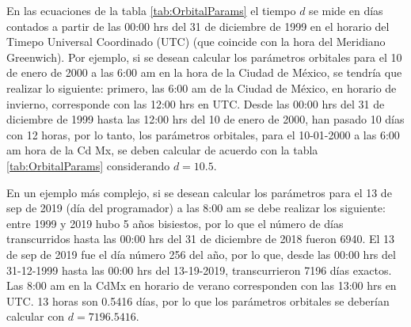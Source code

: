 \documentclass[a4paper,10pt]{article}
\begin{document}
En las ecuaciones de la tabla \ref{tab:OrbitalParams} el tiempo $d$ se mide en días contados a partir de las 00:00 hrs del 31 de diciembre de 1999 en el horario del Timepo Universal Coordinado (UTC) (que coincide con la hora del Meridiano Greenwich). Por ejemplo, si se desean calcular los parámetros orbitales para el 10 de enero de 2000 a las 6:00 am en la hora de la Ciudad de México, se tendría que realizar lo siguiente: primero, las 6:00 am de la Ciudad de México, en horario de invierno, corresponde con las 12:00 hrs en UTC. Desde las 00:00 hrs del 31 de diciembre de 1999 hasta las 12:00 hrs del 10 de enero de 2000, han pasado 10 días con 12 horas, por lo tanto, los parámetros orbitales, para el 10-01-2000 a las 6:00 am hora de la Cd Mx, se deben calcular de acuerdo con la tabla \ref{tab:OrbitalParams} considerando $d=10.5$.

En un ejemplo más complejo, si se desean calcular los parámetros para el 13 de sep de 2019 (día del programador) a las 8:00 am se debe realizar los siguiente: entre 1999 y 2019 hubo 5 años bisiestos, por lo que el número de días transcurridos hasta las 00:00 hrs del 31 de diciembre de 2018 fueron 6940. El 13 de sep de 2019 fue el día número 256 del año, por lo que, desde las 00:00 hrs del 31-12-1999 hasta las 00:00 hrs del 13-19-2019, transcurrieron 7196 días exactos. Las 8:00 am en la CdMx en horario de verano corresponden con las 13:00 hrs  en UTC. 13 horas son 0.5416 días, por lo que los parámetros orbitales se deberían calcular con $d=7196.5416$.
\end{document}
